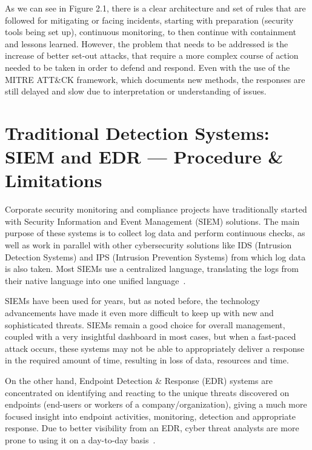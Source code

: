 \documentclass[12pt,a4paper]{report}
\begin{document}
As we can see in Figure 2.1, there is a clear architecture and set of rules that are followed for mitigating or facing incidents, starting with preparation (security tools being set up), continuous monitoring, to then continue with containment and lessons learned. However, the problem that needs to be addressed is the increase of better set-out attacks, that
require a more complex course of action needed to be taken in order to defend and respond.
Even with the use of the MITRE ATT\&CK framework, which documents new methods, the responses
are still delayed and slow due to interpretation or understanding of issues.

\section{Traditional Detection Systems: SIEM and EDR --- Procedure \& Limitations}

Corporate security monitoring and compliance projects have traditionally started with Security
Information and Event Management (SIEM) solutions. The main purpose of these systems is to
collect log data and perform continuous checks, as well as work in parallel with other
cybersecurity solutions like IDS (Intrusion Detection Systems) and IPS (Intrusion Prevention
Systems) from which log data is also taken. Most SIEMs use a centralized language, translating
the logs from their native language into one unified language~\cite{ref3}.

SIEMs have been used for years, but as noted before, the technology advancements have made it
even more difficult to keep up with new and sophisticated threats. SIEMs remain a good choice for
overall management, coupled with a very insightful dashboard in most cases, but when a fast-paced
attack occurs, these systems may not be able to appropriately deliver a response in the required
amount of time, resulting in loss of data, resources and time.

On the other hand, Endpoint Detection \& Response (EDR) systems are concentrated on identifying
and reacting to the unique threats discovered on endpoints (end-users or workers of a
company/organization), giving a much more focused insight into endpoint activities, monitoring,
detection and appropriate response. Due to better visibility from an EDR, cyber threat analysts
are more prone to using it on a day-to-day basis~\cite{ref4}.
\end{document}
